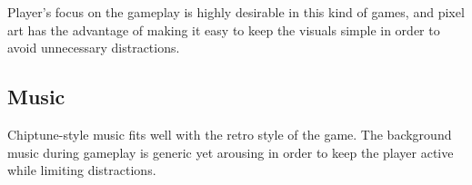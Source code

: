 \documentclass[a4paper,11pt]{article}
\begin{document}
Player's focus on the gameplay is highly desirable in this kind of games, and pixel art has the advantage of making it easy to keep the visuals simple in order to avoid unnecessary distractions.

\subsection{Music}
Chiptune-style music fits well with the retro style of the game. The background music during gameplay is generic yet arousing in order to keep the player active while limiting distractions.
\end{document}
